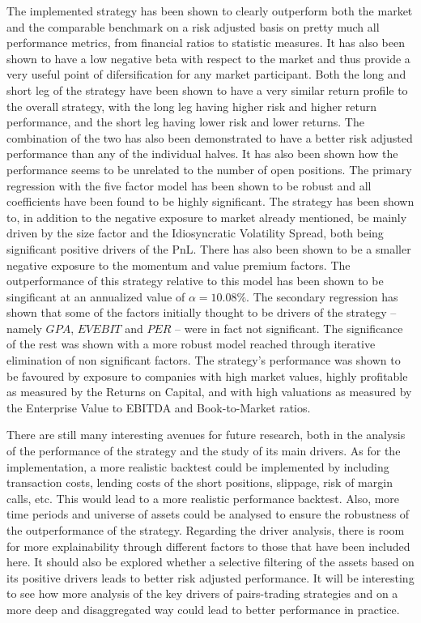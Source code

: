 The implemented strategy has been shown to clearly outperform both the market and the comparable benchmark on a risk adjusted basis on pretty much all performance metrics, from financial ratios to statistic measures. It has also been shown to have a low negative beta with respect to the market and thus provide a very useful point of difersification for any market participant. Both the long and short leg of the strategy have been shown to have a very similar return profile to the overall strategy, with the long leg having higher risk and higher return performance, and the short leg having lower risk and lower returns. The combination of the two has also been demonstrated to have a better risk adjusted performance than any of the individual halves. It has also been shown how the performance seems to be unrelated to the number of open positions. 
The primary regression with the five factor model has been shown to be robust and all coefficients have been found to be highly significant. The strategy has been shown to, in addition to the negative exposure to market already mentioned, be mainly driven by the size factor and the Idiosyncratic Volatility Spread, both being significant positive drivers of the PnL. There has also been shown to be a smaller negative exposure to the momentum and value premium factors. The outperformance of this strategy relative to this model has been shown to be singificant at an annualized value of $\alpha=10.08\%$. 
The secondary regression has shown that some of the factors initially thought to be drivers of the strategy -- namely $GPA$, $EVEBIT$ and $PER$ -- were in fact not significant. The significance of the rest was shown with a more robust model reached through iterative elimination of non significant factors. The strategy's performance was shown to be favoured by exposure to companies with high market values, highly profitable as measured by the Returns on Capital, and with high valuations as measured by the Enterprise Value to EBITDA and Book-to-Market ratios. 

There are still many interesting avenues for future research, both in the analysis of the performance of the strategy and the study of its main drivers. 
As for the implementation, a more realistic backtest could be implemented by including transaction costs, lending costs of the short positions, slippage, risk of margin calls, etc. This would lead to a more realistic performance backtest. Also, more time periods and universe of assets could be analysed to ensure the robustness of the outperformance of the strategy.
Regarding the driver analysis, there is room for more explainability through different factors to those that have been included here. It should also be explored whether a selective filtering of the assets based on its positive drivers leads to better risk adjusted performance. It will be interesting to see how more analysis of the key drivers of pairs-trading strategies and on a more deep and disaggregated way could lead to better performance in practice. 